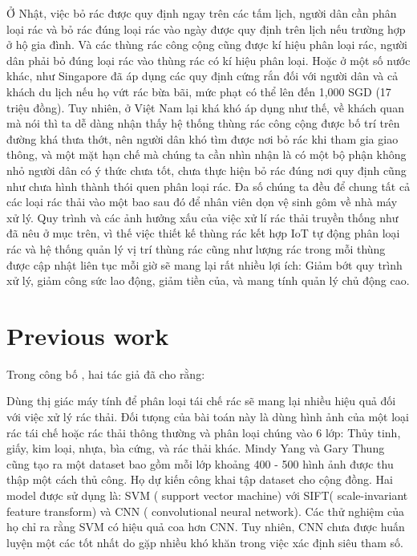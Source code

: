 Ở Nhật, việc bỏ rác được quy định ngay trên các tấm lịch, người dân cần phân loại rác và bỏ rác đúng loại rác vào ngày được quy định trên lịch nếu trường hợp ở hộ gia đình. Và các thùng rác công cộng cũng được kí hiệu phân loại rác, người dân phải bỏ đúng loại rác vào thùng rác có kí hiệu phân loại. Hoặc ở một số nước khác, như Singapore đã áp dụng các quy định cứng rắn đối với người dân và cả khách du lịch nếu họ vứt rác bừa bãi, mức phạt có thể lên đến 1,000 SGD (17 triệu đồng). Tuy nhiên, ở Việt Nam lại khá khó áp dụng như thế, về khách quan mà nói thì ta dễ dàng nhận thấy hệ thống thùng rác công cộng được bố trí trên đường khá thưa thớt, nên người dân khó tìm được nơi bỏ rác khi tham gia giao thông, và một mặt hạn chế mà chúng ta cần nhìn nhận là có một bộ phận không nhỏ người dân có ý thức chưa tốt, chưa thực hiện bỏ rác đúng nơi quy định cũng như chưa hình thành thói quen phân loại rác. Đa số  chúng ta đều để chung tất cả các loại rác thải vào một bao sau đó để nhân viên dọn vệ sinh gôm về nhà máy xử lý. Quy trình và các ảnh hưởng xấu của việc xử lí rác thải truyền thống như đã nêu ở mục trên, vì thế việc thiết kế thùng rác kết hợp IoT tự động phân loại rác và hệ thống quản lý vị trí thùng rác cũng như lượng rác trong mỗi thùng được cập nhật liên tục mỗi giờ sẽ mang lại rất nhiều lợi ích: Giảm bớt quy trình xử lý, giảm công sức lao động, giảm tiền của, và mang tính quản lý chủ động cao.



\section{Previous work}
Trong công bố  \cite{trashnet}, hai tác giả đã cho rằng:

Dùng thị giác máy tính để phân loại tái chế rác sẽ mang lại nhiều hiệu quả đối với việc xử lý rác thải. Đối tưọng của bài toán này là dùng hình ảnh của một loại rác tái chế hoặc rác thải thông thường và phân loại chúng vào 6 lớp: Thủy tinh, giấy, kim loại, nhựa, bìa cứng, và rác thải khác. Mindy Yang và Gary Thung cũng tạo ra một dataset bao gồm mỗi lớp khoảng 400 - 500 hình ảnh được thu thập một cách thủ công. Họ dự kiến công khai tập dataset cho cộng đồng. Hai model được sử dụng là: SVM ( support vector machine) với SIFT( scale-invariant feature transform) và CNN ( convolutional neural network). Các thử nghiệm của họ chỉ ra rằng SVM có hiệu quả coa hơn CNN. Tuy nhiên, CNN chưa được huấn luyện một các tốt nhất do gặp nhiều khó khăn trong việc xác định siêu tham số.

